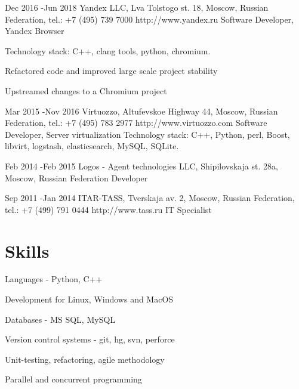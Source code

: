 \documentclass[9pt]{article} %
\begin{document}

\job
{Dec 2016 -}{Jun 2018}
{Yandex LLC, Lva Tolstogo st. 18, Moscow, Russian Federation, tel.: +7 (495) 739 7000}
{http://www.yandex.ru}
{Software Developer, Yandex Browser}
{
Technology stack: C++, clang tools, python, chromium.
\begin{itemize-noindent}
\setlength\itemsep{-0.5em}
\item{Refactored code and improved large scale project stability}
\item{Upstreamed changes to a Chromium project}
\end{itemize-noindent}
}


\job
{Mar 2015 -}{Nov 2016}
{Virtuozzo, Altufevskoe Highway 44, Moscow, Russian Federation, tel.: +7 (495) 783 2977}
{http://www.virtuozzo.com}
{Software Developer, Server virtualization}
{
Technology stack: C++, Python, perl, Boost, libvirt, logstash, elasticsearch, MySQL, SQLite.
}


\job
{Feb 2014 -}{Feb 2015}
{Logos - Agent technologies LLC, Shipilovskaja st. 28a, Moscow, Russian Federation}
{}
{Developer}


\job
{Sep 2011 -}{Jan 2014}
{ITAR-TASS, Tverskaja av. 2, Moscow, Russian Federation, tel.: +7 (499) 791 0444}
{http://www.tass.ru}
{IT Specialist}


\section{Skills}

\begin{multicols}{2}
\begin{itemize-noindent}
\setlength\itemsep{-0.5em}
\item Languages - Python, C++
\item Development for Linux, Windows and MacOS
\item Databases - MS SQL, MySQL
\item Version control systems - git, hg, svn, perforce
\item Unit-testing, refactoring, agile methodology
\item Parallel and concurrent programming
\end{itemize-noindent}
\end{multicols}
\end{document}
